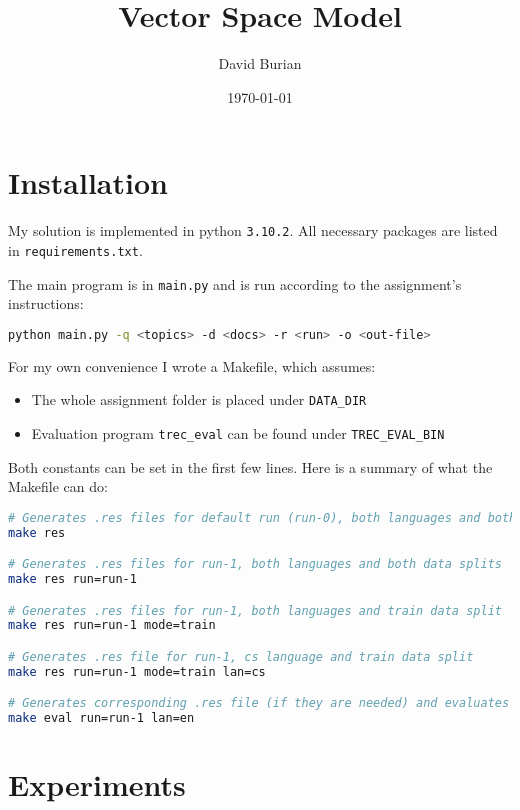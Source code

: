 \documentclass[10pt]{article}
\author{David Burian}
\date{\today}
\title{Vector Space Model}
\begin{document}
\maketitle


\section{Installation}

My solution is implemented in python \verb|3.10.2|. All necessary packages are
listed in \verb|requirements.txt|.

The main program is in \verb|main.py| and is run according to the assignment's
instructions:
\begin{lstlisting}[language=bash]
python main.py -q <topics> -d <docs> -r <run> -o <out-file>
\end{lstlisting}

For my own convenience I wrote a Makefile, which assumes:

\begin{itemize}

    \item The whole assignment folder is placed under \verb|DATA_DIR|
    \item Evaluation program \verb|trec_eval| can be found under \verb|TREC_EVAL_BIN|
\end{itemize}

Both constants can be set in the first few lines. Here is a summary of what the
Makefile can do:

\begin{lstlisting}[language=bash,texcl=true]
# Generates .res files for default run (run-0), both languages and both data splits
make res

# Generates .res files for run-1, both languages and both data splits
make res run=run-1

# Generates .res files for run-1, both languages and train data split
make res run=run-1 mode=train

# Generates .res file for run-1, cs language and train data split
make res run=run-1 mode=train lan=cs

# Generates corresponding .res file (if they are needed) and evaluates them using trec\_eval
make eval run=run-1 lan=en
\end{lstlisting}

\section{Experiments}
\end{document}

